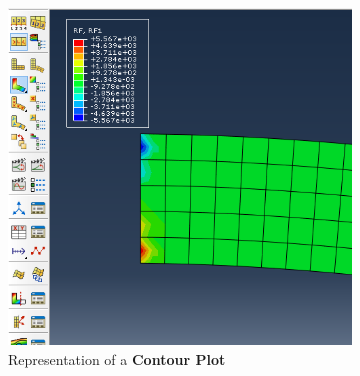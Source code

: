 \begin{enumerate}
 \begin{figure}[H]
   \centering
   \begin{subfigure}{0.30\textwidth}
     \includegraphics[width=\textwidth]{./body/images/imagen98}
     \caption{Representation of a \textbf{Contour Plot}}
     \label{figu98}
   \end{subfigure}%
   ~ %
   \begin{subfigure}{0.30\textwidth}

\end{subfigure}
\end{figure}
\end{enumerate}
